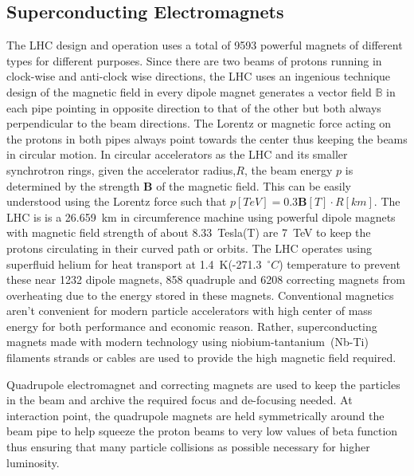   
\subsection{Superconducting Electromagnets}
The LHC design and operation uses a total of 9593 powerful magnets of different types for different purposes. Since there are two beams of protons running in clock-wise and anti-clock wise directions, the LHC uses an ingenious technique design  of the magnetic field in every dipole magnet generates a vector field $\mathbb{B}$ in each pipe pointing in opposite direction to that of the other but both always perpendicular to the beam directions. The Lorentz or magnetic force acting on the protons in both pipes always point towards the center thus keeping the beams in circular motion. In circular accelerators as the LHC and its smaller synchrotron rings, given the accelerator radius,$R$, the beam energy $p$ is determined by the strength $\mathbf{B}$ of the magnetic field. This can be easily understood using the Lorentz force  such that $\displaystyle{p[TeV] = 0.3\mathbf{B}[T]\cdot R[km] }$.
The LHC is is a 26.659~km in circumference machine using powerful dipole magnets with magnetic field strength of about 8.33~Tesla(T) are 7~TeV to keep the protons circulating in their curved path or orbits. The LHC operates using superfluid helium for heat transport at 1.4~K(-271.3~$^{\circ}C$)  temperature to prevent these near 1232 dipole magnets, 858 quadruple and 6208 correcting magnets from overheating due to the energy stored in these magnets. Conventional magnetics aren't convenient for modern particle accelerators with high center of mass energy for both performance and economic reason. Rather, superconducting magnets made with modern technology using  niobium-tantanium~(Nb-Ti) filaments strands or cables are used to provide the high magnetic field required. 

Quadrupole electromagnet and correcting magnets are  used to keep the particles in the beam and archive the required focus and de-focusing needed. At interaction point, the quadrupole magnets are held symmetrically around the beam pipe to help squeeze the proton beams to very low values of beta function thus ensuring that many particle collisions as possible necessary for higher luminosity.


